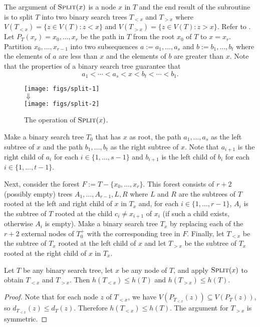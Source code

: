 \documentclass[kpfonts]{patmorin}
\let\le\leqslant
\begin{document}
The argument of $\textsc{Split}(x)$ is a node $x$ in $T$ and the end result of the subroutine is to split $T$ into two binary search trees $T_{<x}$ and $T_{>x}$ where $V(T_{<x})=\{z\in V(T): z<x\}$ and $V(T_{>x})=\{z\in V(T): z>x\}$. Refer to .  Let $P_T(x_r)=x_0,\ldots,x_r$ be the path in $T$ from the root $x_0$ of $T$ to $x=x_r$.  Partition $x_0,\ldots,x_{r-1}$ into two subsequences $a:=a_1,\ldots,a_s$ and $b:=b_1,\ldots,b_t$ where the elements of $a$ are less than $x$ and the elements of $b$ are greater than $x$.
Note that the properties of a binary search tree guarantee that
\[
a_1 < \cdots < a_s < x < b_t < \cdots < b_1.
\]
\begin{figure}
  \begin{center}
    \texttt{[image: figs/split-1]} \\[1ex]
    $\Downarrow$ \\[1ex]
    \texttt{[image: figs/split-2]}
  \end{center}
  \caption{The operation of $\textsc{Split}(x)$.}
\end{figure}

Make a binary search tree $T_0$ that has $x$ as root, the path $a_1,\ldots,a_s$ as the left subtree of $x$ and the path $b_1,\ldots,b_t$ as the right subtree of $x$.  Note that $a_{i+1}$ is the right child of $a_i$ for each $i\in\{1,\ldots,s-1\}$ and $b_{i+1}$ is the left child of $b_i$ for each $i\in\{1,\ldots,t-1\}$.

Next, consider the forest $F:=T-\{x_0,\ldots,x_r\}$. This forest consists of $r+2$ (possibly empty) trees $A_1,\ldots,A_{r-1},L,R$ where $L$ and $R$ are the subtrees of $T$ rooted at the left and right child of $x$ in $T_x$ and, for each $i\in\{1,\ldots,r-1\}$, $A_i$ is the subtree of $T$ rooted at the child $c_i\neq x_{i+1}$ of $x_i$ (if such a child exists, otherwise $A_i$ is empty).  Make a binary search tree $T_x$ by replacing each of the $r+2$ external nodes of $T_0^+$ with the corresponding tree in $F$.  Finally, let $T_{<x}$ be the subtree of $T_x$ rooted at the left child of $x$ and let $T_{>x}$ be the subtree of $T_x$ rooted at the right child of $x$ in $T_x$.

\begin{lem}
  Let $T$ be any binary search tree, let $x$ be any node of $T$, and apply $\textsc{Split}(x)$ to obtain $T_{<x}$ and $T_{>x}$.
  Then $h(T_{<x})\le h(T)$ and $h(T_{>x})\le h(T)$.
\end{lem}

\begin{proof}
  Note that for each node $z$ of $T_{<x}$, we have $V(P_{T_{<x}}(z))\subseteq V(P_T(z))$,
  so $d_{T_{<x}}(z)\le d_T(z)$.
  Therefore $h(T_{<x})\le h(T)$. The argument for $T_{>x}$ is symmetric.
\end{proof}
\end{document}
